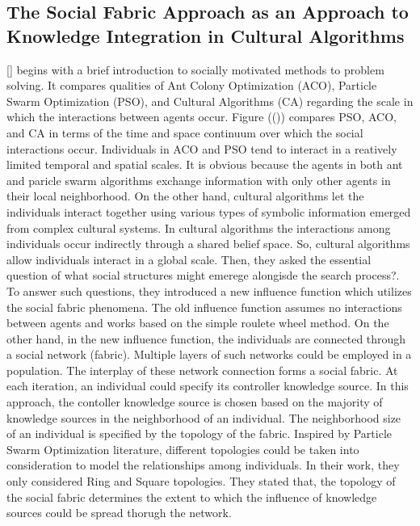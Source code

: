 \subsection{The Social Fabric Approach as an Approach to Knowledge Integration in Cultural Algorithms}	
[] begins with a brief introduction to socially motivated methods to problem solving. It compares qualities of Ant Colony Optimization (ACO), Particle Swarm Optimization (PSO), and Cultural Algorithms (CA) regarding the scale in which the interactions between agents occur. Figure (()) compares PSO, ACO, and CA in terms of the time and space continuum over which the social interactions occur. Individuals in ACO and PSO tend to interact in a reatively limited temporal and spatial scales. It is obvious because the agents in both ant and paricle swarm algorithms exchange information with only other agents in their local neighborhood. On the other hand, cultural algorithms let the individuals interact together using various types of symbolic information emerged from complex cultural systems. In cultural algorithms the interactions among individuals occur indirectly through a shared belief space. So, cultural algorithms allow individuals interact in a global scale.\newline
Then, they asked the essential question of what social structures might emerege alongisde the search process?. To answer such questions, they introduced a new influence function which utilizes the social fabric phenomena. The old influence function assumes no interactions between agents and works based on the simple roulete wheel method. On the other hand, in the new influence function, the individuals are connected through a social network (fabric). Multiple layers of such networks could be employed in a population. The interplay of these network connection forms a social fabric. At each iteration, an individual could specify its controller knowledge source. In this approach, the contoller knowledge source is chosen based on the majority of knowledge sources in the neighborhood of an individual. The neighborhood size of an individual is specified by the topology of the fabric. Inspired by Particle Swarm Optimization literature, different topologies could be taken into consideration to model the relationships among individuals. In their work, they only considered Ring and Square topologies. They stated that, the topology of the social fabric determines the extent to which the influence of knowledge sources could be spread thorugh the network.\newline
